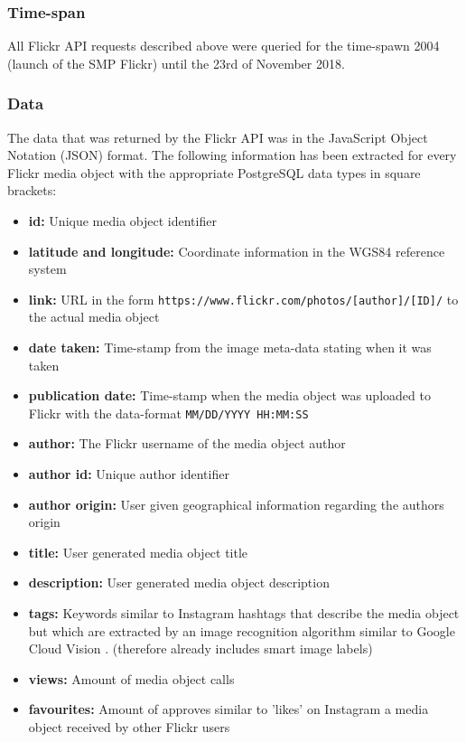 \subsubsection{Time-span} \label{flickr_timespan}
All Flickr API requests described above were queried for the time-spawn 2004 (launch of the SMP Flickr) until the 23rd of November 2018.

\subsubsection{Data} \label{flickr_data}
The data that was returned by the Flickr API was in the JavaScript Object Notation (JSON) format. The following information has been extracted for every Flickr media object with the appropriate PostgreSQL data types in square brackets:\\

\begin{itemize}[label={}]
    \item \textbf{id:} Unique media object identifier 
    \item \textbf{latitude and longitude:} Coordinate information in the WGS84 reference system 
    \item \textbf{link:} URL in the form \texttt{https://www.flickr.com/photos/[author]/[ID]/} to the actual media object 
    \item \textbf{date taken:} Time-stamp from the image meta-data stating when it was taken 
    \item \textbf{publication date:} Time-stamp when the media object was uploaded to Flickr with the data-format \texttt{MM/DD/YYYY HH:MM:SS} 
    \item \textbf{author:} The Flickr username of the media object author 
    \item \textbf{author id:} Unique author identifier  
    \item \textbf{author origin:} User given geographical information regarding the authors origin 
    \item \textbf{title:} User generated media object title 
    \item \textbf{description:} User generated media object description 
    \item \textbf{tags:} Keywords similar to Instagram hashtags that describe the media object but which are extracted by an image recognition algorithm similar to Google Cloud Vision \parencite{Flickr2019}. (therefore already includes smart image labels) 
    \item \textbf{views:} Amount of media object calls 
    \item \textbf{favourites:} Amount of approves similar to 'likes' on Instagram a media object received by other Flickr users 
\end{itemize}

